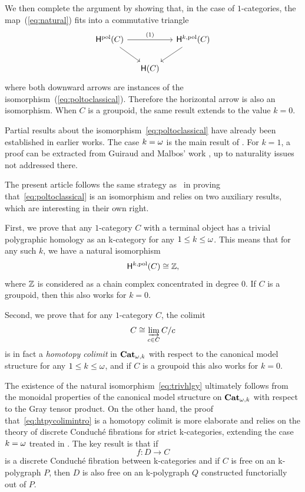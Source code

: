   We then complete the argument by showing that, in the case of
  $1$-categories, the map~(\ref{eq:natural}) fits into a commutative triangle
 \[
    \begin{tikzcd}[column sep=small]
      \Hopol(C) \ar[dr]\ar[rr,"(1)"]&&\Hop k (C)\ar[dl]\\
      &\Ho(C)&
    \end{tikzcd}
  \]
  where both downward arrows are instances of the
  isomorphism~(\ref{eq:poltoclassical}). Therefore the horizontal
  arrow is also an isomorphism. When $C$ is a groupoid, the same
  result extends to the value $k=0$.

  Partial results about the isomorphism~\eqref{eq:poltoclassical} have
already been established in earlier works. The case $k=\omega$ is the main result of
\cite{guetta:homcat}. For $k=1$, a proof can be
extracted from Guiraud and Malbos' work \cite[Theorem
5.4.3]{guiraudmalbos:higdns}, up to naturality issues not addressed there.

The present article follows the same strategy as~\cite{guetta:homcat}
in proving that~\eqref{eq:poltoclassical} is an isomorphism and relies on two
 auxiliary results, which are interesting in their own right.

 First, we prove that any $1$-category $C$ with a terminal object has a
 trivial polygraphic homology as an \ook k-category for any $1 \leq k
 \leq \omega$. This means that for any such $k$, we have a natural isomorphism
   \begin{equation}\label{eq:trivhlgy}
      \mathsf{H}^{k,\mathrm{pol}} (C) \cong \mathbb Z,
    \end{equation}
    where $\mathbb Z$ is considered as a chain complex concentrated in degree
    $0$. If $C$ is a groupoid, then this also works for $k=0$.

    Second, we prove that for any $1$-category $C$, the colimit
    \begin{equation}\label{eq:htpycolimintro}
      C \cong \varinjlim_{c \in C} C/c
    \end{equation}
    is in fact a \emph{homotopy colimit} in $\mathbf{Cat}_{\omega,k}$ with respect to the
    canonical model structure for any $1 \leq k \leq \omega$, and if $C$ is a
    groupoid this also works for $k=0$. 

The existence of the natural
isomorphism~\eqref{eq:trivhlgy} ultimately follows from
the monoidal properties of the canonical model structure on $\mathbf{Cat}_{\omega,k}$
with respect to the Gray tensor product. On the other hand, the proof
that~\eqref{eq:htpycolimintro} is a homotopy colimit is more elaborate and
relies on the theory of discrete Conduché fibrations for strict \ook k-categories, extending the case $k=\omega$ treated in
\cite{guetta:poldcf}. The key result is that if \[f \colon D
\to C\] is a discrete Conduché fibration between \ook k-categories and
if $C$ is free on an \ook k-polygraph $P$, then $D$ is also free on an
\ook k-polygraph $Q$ constructed functorially out of $P$. 


